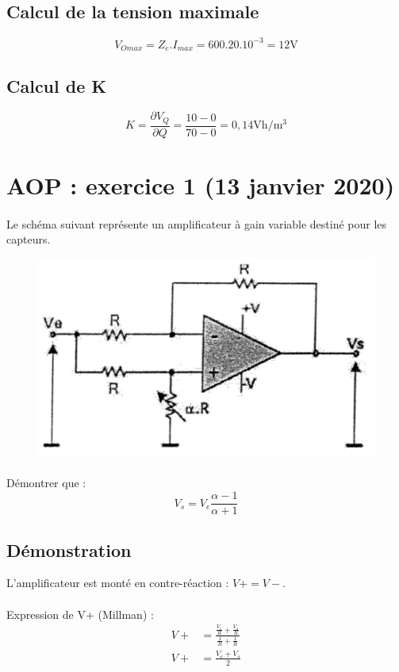 \documentclass{article}
\begin{document}
\subsection{Calcul de la tension maximale}
$$V_{O max} = Z_e . I_{max} = 600.20.10^{-3} = 12 \si{\volt}$$

\subsection{Calcul de K}
$$K = \frac{\partial V_Q}{\partial Q} = \frac{10 - 0}{70 - 0} = 0,14 \si{\volt\hour}/\si{\meter^3}$$


\newpage
\section{AOP : exercice 1 (13 janvier 2020)}
\paragraph{}
Le schéma suivant représente un amplificateur à gain variable destiné pour les capteurs.
\begin{figure}[H]
    \centering
    \includegraphics[width=0.4\linewidth]{./images/AOP1.png}
\end{figure}
\paragraph{}
Démontrer que : $$V_s = V_e \frac{\alpha - 1}{\alpha + 1}$$

\subsection{Démonstration}
L'amplificateur est monté en contre-réaction : $V+ = V-$.

\paragraph{}Expression de V+ (Millman) :
\begin{align*}
    V+ & = \frac{\frac{V_e}{R}+\frac{V_s}{R}}{\frac{1}{R}+\frac{1}{R}} \\
    V+ & = \frac{V_e + V_s}{2}                                         \\
\end{align*}
\end{document}
